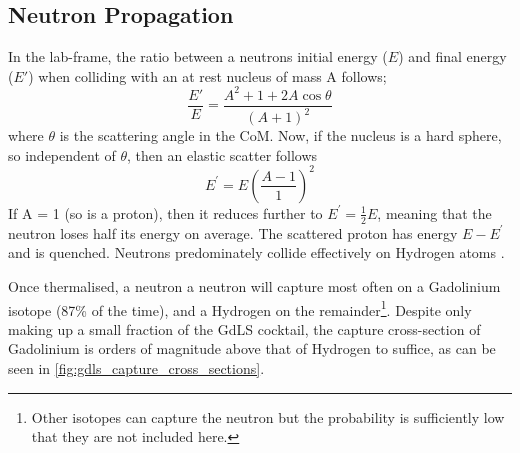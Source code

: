 \subsection{Neutron Propagation}
\par
In the lab-frame, the ratio between a neutrons initial energy ($E$) and final energy ($E'$) when colliding with an at rest nucleus of mass A follows;
\begin{equation}
    \frac{E'}{E} = \frac{A^2 + 1 + 2A\cos{\theta}}{(A + 1)^2}
\end{equation}
where $\theta$ is the scattering angle in the CoM.
Now, if the nucleus is a hard sphere, so independent of $\theta$, then an elastic scatter follows
\begin{equation}
    E^{'} = E(\frac{A-1}{1})^{2}
\end{equation}
If A = 1 (so is a proton), then it reduces further to $E^{'} = \frac{1}{2}E$, meaning that the neutron loses half its energy on average.
The scattered proton has energy $E - E^{'}$ and is quenched.
Neutrons predominately collide effectively on Hydrogen atoms \cite{neutron_thermalisation_and_capture_ref}.

\par
Once thermalised, a neutron a neutron will capture most often on a Gadolinium isotope (87\% of the time), and a Hydrogen on the remainder\footnote{Other isotopes can capture the neutron but the probability is sufficiently low that they are not included here.}.
Despite only making up a small fraction of the GdLS cocktail, the capture cross-section of Gadolinium is orders of magnitude above that of Hydrogen to suffice, as can be seen in \autoref{fig:gdls_capture_cross_sections}.



